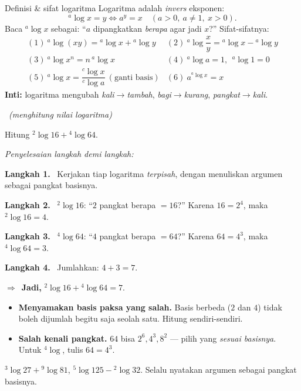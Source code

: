 \documentclass[11pt,a4paper]{report}
\theoremstyle{gaya}
\newcommand{\jawab}{\par\smallskip\noindent\textit{\textcolor{oranye}{Penyelesaian langkah demi langkah:}}\par\smallskip}
\newcommand{\langkah}[1]{\par\smallskip\noindent\textbf{\textcolor{biru}{Langkah #1.}}\ }
\newcommand{\jadi}{\par\smallskip\noindent$\Rightarrow$\ \textbf{Jadi, }}
\newcommand{\soalno}[2]{%
  \par\bigskip
  \noindent{\large\bfseries\color{ungu}\rule[-2pt]{4pt}{14pt}\ Soal #1}%
  \ {\normalfont\itshape\color{gray}(#2)}\par\nopagebreak\smallskip}
\begin{document}
\begin{ingat}{Definisi \& sifat logaritma}
Logaritma adalah \emph{invers} eksponen:
\[
{}^{a}\!\log x = y \iff a^{y}=x \quad (a>0,\ a\neq1,\ x>0).
\]
Baca ${}^{a}\!\log x$ sebagai: ``$a$ dipangkatkan \emph{berapa} agar jadi $x$?''
Sifat-sifatnya:
\[
\begin{array}{ll}
(1)\ {}^{a}\!\log(xy)={}^{a}\!\log x+{}^{a}\!\log y &
(2)\ {}^{a}\!\log\dfrac xy={}^{a}\!\log x-{}^{a}\!\log y\\[7pt]
(3)\ {}^{a}\!\log x^n = n\,{}^{a}\!\log x &
(4)\ {}^{a}\!\log a=1,\ \ {}^{a}\!\log1=0\\[7pt]
(5)\ {}^{a}\!\log x=\dfrac{{}^{c}\!\log x}{{}^{c}\!\log a}\ (\text{ganti basis}) &
(6)\ a^{{}^{a}\!\log x}=x
\end{array}
\]
\textbf{Inti:} logaritma mengubah \emph{kali}$\to$\emph{tambah},
\emph{bagi}$\to$\emph{kurang}, \emph{pangkat}$\to$\emph{kali}.
\end{ingat}

\soalno{1.3.1}{menghitung nilai logaritma}
\begin{soalbox}{}
Hitung ${}^{2}\!\log 16 + {}^{4}\!\log 64$.
\end{soalbox}

\jawab
\langkah{1} Kerjakan tiap logaritma \emph{terpisah}, dengan menuliskan argumen
sebagai pangkat basisnya.
\langkah{2} ${}^{2}\!\log 16$: ``$2$ pangkat berapa $=16$?'' Karena $16=2^4$,
maka ${}^{2}\!\log16=4$.
\langkah{3} ${}^{4}\!\log 64$: ``$4$ pangkat berapa $=64$?'' Karena $64=4^3$,
maka ${}^{4}\!\log64=3$.
\langkah{4} Jumlahkan: $4+3=7$.
\jadi ${}^{2}\!\log16+{}^{4}\!\log64 = 7$.

\begin{jebakan}
\begin{itemize}[leftmargin=*,topsep=2pt]
  \item \textbf{Menyamakan basis paksa yang salah.} Basis berbeda ($2$ dan $4$)
  tidak boleh dijumlah begitu saja seolah satu. Hitung sendiri-sendiri.
  \item \textbf{Salah kenali pangkat.} $64$ bisa $2^6, 4^3, 8^2$ --- pilih yang
  \emph{sesuai basisnya}. Untuk ${}^{4}\!\log$, tulis $64=4^3$.
\end{itemize}
\end{jebakan}

\begin{variasi}
${}^{3}\!\log 27 + {}^{9}\!\log 81$, ${}^{5}\!\log125 - {}^{2}\!\log32$. Selalu
nyatakan argumen sebagai pangkat basisnya.
\end{variasi}
\end{document}

